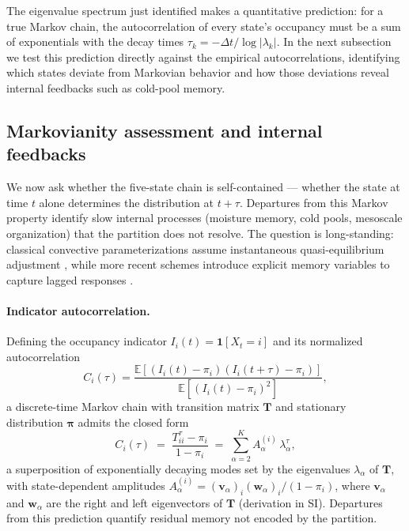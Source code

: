 \documentclass[11pt]{article}
\begin{document}
The eigenvalue spectrum just identified makes a quantitative prediction: for a true Markov chain, the autocorrelation of every state's occupancy must be a sum of exponentials with the decay times $\tau_k = -\Delta t / \log|\lambda_k|$. In the next subsection we test this prediction directly against the empirical autocorrelations, identifying which states deviate from Markovian behavior and how those deviations reveal internal feedbacks such as cold-pool memory.


\subsection{Markovianity assessment and internal feedbacks}\label{sec:markov}

We now ask whether the five-state chain is self-contained --- whether the state at time $t$ alone determines the distribution at $t+\tau$. Departures from this Markov property identify slow internal processes (moisture memory, cold pools, mesoscale organization) that the partition does not resolve. The question is long-standing: classical convective parameterizations assume instantaneous quasi-equilibrium adjustment \citep{zhang2003convective, bechtold2014representing}, while more recent schemes introduce explicit memory variables to capture lagged responses \citep{piriou2007approach, gerard2009cloud, mapes2011parameterizing, hwong2023assessing}.

\paragraph{Indicator autocorrelation.}
Defining the occupancy indicator $I_i(t) = \mathbf{1}[X_t = i]$ and its normalized autocorrelation
\begin{equation}
C_i(\tau) =
\frac{\mathbb{E}\!\left[(I_i(t)-\pi_i)(I_i(t+\tau)-\pi_i)\right]}
     {\mathbb{E}\!\left[(I_i(t)-\pi_i)^2\right]},
\end{equation}
a discrete-time Markov chain with transition matrix $\mathbf{T}$ and stationary distribution $\boldsymbol{\pi}$ admits the closed form \citep{souza2024representing}
\begin{equation}
C_i(\tau) \;=\; \frac{T^\tau_{ii} - \pi_i}{1-\pi_i}
\;=\; \sum_{\alpha=2}^K A_\alpha^{(i)}\, \lambda_\alpha^\tau,
\label{eq:autocor}
\end{equation}
a superposition of exponentially decaying modes set by the eigenvalues $\lambda_\alpha$ of $\mathbf{T}$, with state-dependent amplitudes $A_\alpha^{(i)} = (\mathbf{v}_\alpha)_i (\mathbf{w}_\alpha)_i / (1-\pi_i)$, where $\mathbf{v}_\alpha$ and $\mathbf{w}_\alpha$ are the right and left eigenvectors of $\mathbf{T}$ (derivation in SI). Departures from this prediction quantify residual memory not encoded by the partition.
\end{document}
